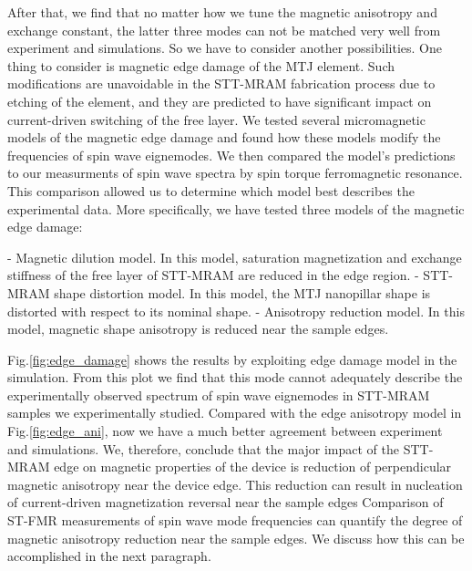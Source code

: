 After that, we find that no matter how we tune the magnetic anisotropy and exchange constant, the latter three modes can not be matched very well from experiment and simulations. So we have to consider another possibilities. One thing to consider is magnetic edge damage of the MTJ element. Such modifications are unavoidable in the STT-MRAM fabrication process due to etching of the element, and they are predicted to have significant impact on current-driven switching of the free layer. We tested several micromagnetic models of the magnetic edge damage and found how these models modify the frequencies of spin wave eignemodes. We then compared the  model’s predictions to our measurments of spin wave spectra by spin torque ferromagnetic resonance. This comparison allowed us to determine which model best describes the experimental data. More specifically, we have tested three models of the magnetic edge damage: 

-	Magnetic dilution model. In this model, saturation magnetization and exchange stiffness of the free layer of STT-MRAM are reduced in the edge region.
-	STT-MRAM shape distortion model. In this model, the MTJ nanopillar shape is distorted with respect to its nominal shape.
-	Anisotropy reduction model. In this model, magnetic shape anisotropy is reduced near the sample edges.

Fig.\ref{fig:edge_damage} shows the results by exploiting edge damage model in the simulation. From this plot we find that this mode cannot adequately describe the experimentally observed spectrum of spin wave eignemodes in STT-MRAM samples we experimentally studied. Compared with the edge anisotropy model in Fig.\ref{fig:edge_ani}, now we have a much better agreement between experiment and simulations. We, therefore, conclude that the major impact of the STT-MRAM edge on magnetic properties of the device is reduction of perpendicular magnetic anisotropy near the device edge. This reduction can result in nucleation of current-driven magnetization reversal near the sample edges  Comparison of ST-FMR measurements of spin wave mode frequencies can quantify the degree of magnetic anisotropy reduction near the sample edges. We discuss how this can be accomplished in the next paragraph. 

